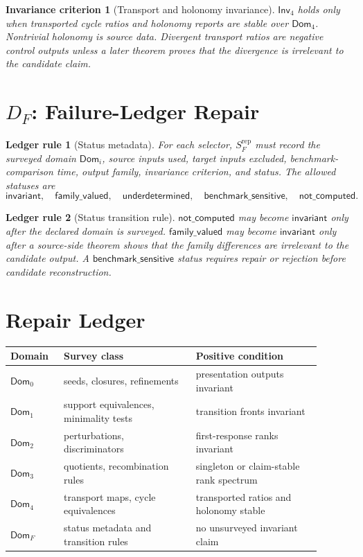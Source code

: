 \documentclass[11pt]{article}
\newcommand{\Dom}{\mathsf{Dom}}
\newcommand{\Inv}{\mathsf{Inv}}
\newtheorem{criterion}{Invariance criterion}
\newtheorem{ledger}{Ledger rule}
\begin{document}
\begin{criterion}[Transport and holonomy invariance]
\(\Inv_4\) holds only when transported cycle ratios and holonomy reports are
stable over \(\Dom_4\). Nontrivial holonomy is source data. Divergent
transport ratios are negative control outputs unless a later theorem proves
that the divergence is irrelevant to the candidate claim.
\end{criterion}

\section{\texorpdfstring{\(D_F\)}{DF}: Failure-Ledger Repair}

\begin{ledger}[Status metadata]
For each selector, \(S_F^{\mathrm{rep}}\) must record the surveyed domain
\(\Dom_i\), source inputs used, target inputs excluded, benchmark-comparison
time, output family, invariance criterion, and status. The allowed statuses
are
\[
\mathsf{invariant},\quad
\mathsf{family\_valued},\quad
\mathsf{underdetermined},\quad
\mathsf{benchmark\_sensitive},\quad
\mathsf{not\_computed}.
\]
\end{ledger}

\begin{ledger}[Status transition rule]
\(\mathsf{not\_computed}\) may become \(\mathsf{invariant}\) only after the
declared domain is surveyed. \(\mathsf{family\_valued}\) may become
\(\mathsf{invariant}\) only after a source-side theorem shows that the
family differences are irrelevant to the candidate output. A
\(\mathsf{benchmark\_sensitive}\) status requires repair or rejection before
candidate reconstruction.
\end{ledger}

\section{Repair Ledger}

\begin{center}
\begin{tabular}{p{0.15\linewidth}p{0.38\linewidth}p{0.36\linewidth}}
\textbf{Domain} & \textbf{Survey class} & \textbf{Positive condition} \\
\hline
\(\Dom_0\) & seeds, closures, refinements & presentation outputs invariant \\
\(\Dom_1\) & support equivalences, minimality tests & transition fronts invariant \\
\(\Dom_2\) & perturbations, discriminators & first-response ranks invariant \\
\(\Dom_3\) & quotients, recombination rules & singleton or claim-stable rank spectrum \\
\(\Dom_4\) & transport maps, cycle equivalences & transported ratios and holonomy stable \\
\(\Dom_F\) & status metadata and transition rules & no unsurveyed invariant claim \\
\end{tabular}
\end{center}
\end{document}
